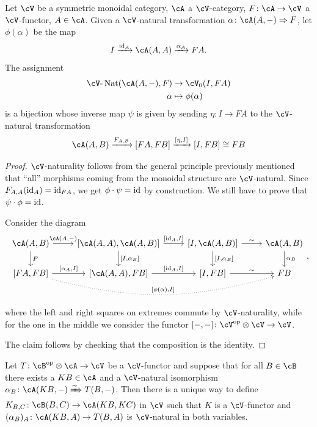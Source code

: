 \documentclass[a4paper,11pt,oneside,openany]{scrbook}
\begin{document}
\begin{thm}
	Let $\cV$ be a symmetric monoidal category, $\cA$ a $\cV$-category,
    $F\colon\cA\rightarrow\cV$ a $\cV$-functor, $A\in\cA$. Given a $\cV$-natural
    transformation $\alpha\colon\cA(A,-)\Rightarrow F$, let $\phi(\alpha)$ be
    the map$$I\xrightarrow{\id_A}\cA(A,A)\xrightarrow{\alpha_A}FA.$$
	The assignment
	\begin{align*}
        \cV\text{-}\Nat(\cA(A,-),F) & \rightarrow\cV_0(I,FA) \\
		\alpha                                     & \mapsto\phi(\alpha)
	\end{align*}
	is a bijection whose inverse map $\psi$ is given by sending $\eta\colon
    I\rightarrow FA$ to the $\cV$-natural transformation
	$$\cA(A,B)\xrightarrow{F_{A,B}}[FA,FB]\xrightarrow{[\eta,I]}[I,FB]\cong FB$$
\end{thm}

\begin{proof}
	$\cV$-naturality follows from the general principle previously mentioned
    that ``all'' morphisms coming from the monoidal structure are $\cV$-natural.
    Since $F_{A,A}(\operatorname{id}_A)=\operatorname{id}_{FA}$, we get $\phi\cdot\psi=\operatorname{id}$ by construction.
    We still have to prove that $\psi\cdot\phi=\operatorname{id}$.

	Consider the diagram
	\[
		\begin{tikzcd}
			\cA(A,B)\ar[r, "{\cA(A,-)}"]\ar[d, "F"]
			& {[\cA(A,A),\cA(A,B)]}\ar[r, "{[\id_A,I]}"]\ar[d, "{[I,\alpha_B]}"]
			& {[I,\cA(A,B)]}\ar[r, "\sim"]\ar[d, "{[I,\alpha_B]}"]
			& \cA(A,B)\ar[d, "\alpha_B"] \\
			{[FA,FB]}\ar[r, "{[\alpha_A,I]}"]\ar[rrr, bend right=15, dotted, "{[\phi(\alpha),I]}"]
			& {[\cA(A,A),FB]}\ar[r, "{[\id_A,I]}"]
			& {[I,FB]}\ar[r, "\sim"]
			& FB
		\end{tikzcd}
		,\]
	where the left and right squares on extremes commute by $\cV$-naturality, while for the one in the middle we consider the functor $[-,-]\colon\cV^{\op}\otimes\cV\rightarrow\cV$.

	The claim follows by checking that the composition is the identity.
\end{proof}

\begin{thm}
	Let $T\colon\cB^{\op}\otimes\cA\rightarrow\cV$ be a $\cV$-functor and
    suppose that for all $B\in\cB$ there exists a $KB\in\cA$ and a $\cV$-natural
    isomorphism $\alpha_B\colon\cA(KB,-)\xRightarrow{\sim} T(B,-)$. Then there
    is a unique way to define $K_{B,C}\colon\cB(B,C)\rightarrow\cA(KB,KC)$ in
    $\cV$ such that $K$ is a $\cV$-functor and
    $(\alpha_B)_A\colon\cA(KB,A)\rightarrow T(B,A)$ is $\cV$-natural in both
    variables.
\end{thm}
\end{document}

